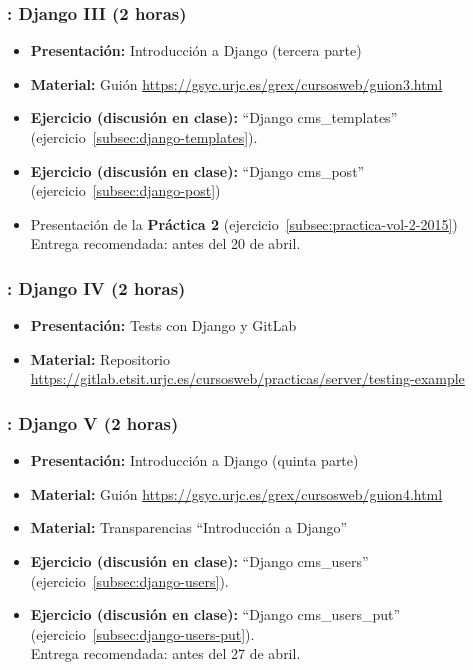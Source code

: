 \documentclass[a4paper,12pt]{article}
\begin{document}
\subsubsection{\lunesH: Django III (2 horas)}
\label{cal:lunesH}

\begin{itemize}
 \item \textbf{Presentación:} Introducción a Django (tercera parte)
  \item \textbf{Material:} Guión \url{https://gsyc.urjc.es/grex/cursosweb/guion3.html}
 \item \textbf{Ejercicio (discusión en clase):} ``Django cms\_templates'' (ejercicio~\ref{subsec:django-templates}).
 \item \textbf{Ejercicio (discusión en clase):} ``Django cms\_post'' (ejercicio~\ref{subsec:django-post}) \\
  \item Presentación de la \textbf{Práctica 2} (ejercicio~\ref{subsec:practica-vol-2-2015}) \\
  Entrega recomendada: antes del 20 de abril.
\end{itemize}

\subsubsection{\lunesI: Django IV (2 horas)}
\label{cal:lunesI}

\begin{itemize}
 \item \textbf{Presentación:} Tests con Django y GitLab
  \item \textbf{Material:} Repositorio \url{https://gitlab.etsit.urjc.es/cursosweb/practicas/server/testing-example}
\end{itemize}


\subsubsection{\lunesJ: Django V (2 horas)}
\label{cal:lunesJ}

\begin{itemize}
 \item \textbf{Presentación:} Introducción a Django (quinta parte)
 \item \textbf{Material:} Guión \url{https://gsyc.urjc.es/grex/cursosweb/guion4.html}
 \item \textbf{Material:} Transparencias ``Introducción a Django''
 \item \textbf{Ejercicio (discusión en clase):} ``Django cms\_users'' (ejercicio~\ref{subsec:django-users}).
 \item \textbf{Ejercicio (discusión en clase):} ``Django cms\_users\_put'' (ejercicio~\ref{subsec:django-users-put}). \\
  Entrega recomendada: antes del 27 de abril.
\end{itemize}
\end{document}
